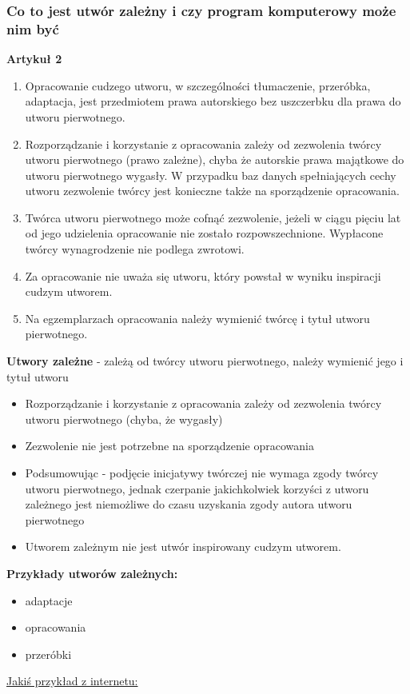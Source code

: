 \documentclass[12pt,a4paper]{article}
\begin{document}
\subsubsection{Co to jest utwór zależny i czy program komputerowy może nim być}
\textbf{Artykuł 2}
\begin{enumerate}
\item Opracowanie cudzego utworu, w szczególności tłumaczenie, przeróbka, adaptacja, jest przedmiotem prawa autorskiego bez uszczerbku dla prawa do utworu pierwotnego.
\item Rozporządzanie i korzystanie z opracowania zależy od zezwolenia twórcy utworu pierwotnego (prawo zależne), chyba że autorskie prawa majątkowe do utworu pierwotnego wygasły. W przypadku baz danych spełniających cechy utworu zezwolenie twórcy jest konieczne także na sporządzenie opracowania.
\item Twórca utworu pierwotnego może cofnąć zezwolenie, jeżeli w ciągu pięciu lat od jego udzielenia opracowanie nie zostało rozpowszechnione. Wypłacone twórcy wynagrodzenie nie podlega zwrotowi.
\item Za opracowanie nie uważa się utworu, który powstał w wyniku inspiracji cudzym utworem.
\item Na egzemplarzach opracowania należy wymienić twórcę i tytuł utworu pierwotnego.
\end{enumerate}
\textbf{Utwory zależne} - zależą od twórcy utworu pierwotnego, należy wymienić jego i tytuł utworu
\begin{itemize}
\item Rozporządzanie i korzystanie z opracowania zależy od zezwolenia twórcy utworu pierwotnego (chyba, że wygasły)
\item Zezwolenie nie jest potrzebne na sporządzenie opracowania
\item  Podsumowując - podjęcie inicjatywy twórczej  nie wymaga zgody twórcy utworu pierwotnego, jednak czerpanie jakichkolwiek korzyści z utworu zależnego jest niemożliwe do czasu uzyskania zgody autora utworu pierwotnego
\item Utworem zależnym nie jest utwór inspirowany cudzym utworem.
\end{itemize}
\textbf{Przykłady utworów zależnych:}
\begin{itemize}
\item adaptacje
\item opracowania
\item przeróbki
\end{itemize}
\href{http://www.experto24.pl/prawo-prywatne/prawo-autorskie/prawo-do-korzystania-z-opracowania-programu-komputerowego.html}{Jakiś przykład z internetu:}
\end{document}
